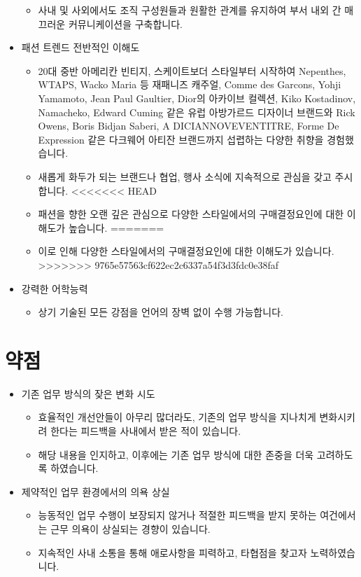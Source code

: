 \documentclass[a4paper,10pt]{extarticle}
\begin{document}
\begin{itemize}
	      \begin{itemize}
		      \item 사내 및 사외에서도 조직 구성원들과 원활한 관계를 유지하여 부서 내외 간 매끄러운 커뮤니케이션을 구축합니다.
	      \end{itemize}
	\item 패션 트렌드 전반적인 이해도
	      \begin{itemize}
		      \item 20대 중반 아메리칸 빈티지, 스케이트보더 스타일부터 시작하여 Nepenthes, WTAPS, Wacko Maria 등 재패니즈 캐주얼, Comme des Garcons, Yohji Yamamoto, Jean Paul Gaultier, Dior의 아카이브 컬렉션, Kiko Kostadinov, Namacheko, Edward Cuming 같은 유럽 아방가르드 디자이너 브랜드와 Rick Owens, Boris Bidjan Saberi, A DICIANNOVEVENTITRE, Forme De Expression 같은 다크웨어 아티잔 브랜드까지 섭렵하는 다양한 취향을 경험했습니다.
		      \item 새롭게 화두가 되는 브랜드나 협업, 행사 소식에 지속적으로 관심을 갖고 주시합니다.
<<<<<<< HEAD
		      \item 패션을 향한 오랜 깊은 관심으로 다양한 스타일에서의 구매결정요인에 대한 이해도가 높습니다.
=======
		      \item 이로 인해 다양한 스타일에서의 구매결정요인에 대한 이해도가 있습니다.
>>>>>>> 9765e57563cf622ec2c6337a54f3d3fdc0e38faf
	      \end{itemize}
	\item 강력한 어학능력
	      \begin{itemize}
		      \item 상기 기술된 모든 강점을 언어의 장벽 없이 수행 가능합니다.
	      \end{itemize}
\end{itemize}

\section*{약점}
\begin{itemize}
	\item 기존 업무 방식의 잦은 변화 시도
	      \begin{itemize}
		      \item 효율적인 개선안들이 아무리 많더라도, 기존의 업무 방식을 지나치게 변화시키려 한다는 피드백을 사내에서 받은 적이 있습니다.
		      \item 해당 내용을 인지하고, 이후에는 기존 업무 방식에 대한 존중을 더욱 고려하도록 하였습니다.
	      \end{itemize}
\end{itemize}
\begin{itemize}
	\item 제약적인 업무 환경에서의 의욕 상실
	      \begin{itemize}
		      \item 능동적인 업무 수행이 보장되지 않거나 적절한 피드백을 받지 못하는 여건에서는 근무 의욕이 상실되는 경향이 있습니다.
		      \item 지속적인 사내 소통을 통해 애로사항을 피력하고, 타협점을 찾고자 노력하였습니다.
	      \end{itemize}
\end{itemize}
\end{document}
